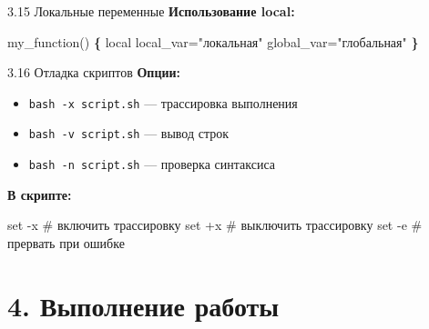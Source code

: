 \documentclass[
  ignorenonframetext,
  aspectratio=169,
  russian,
]{beamer}
\newenvironment{Shaded}{\begin{snugshade}}{\end{snugshade}}
\newcommand{\AttributeTok}[1]{\textcolor[rgb]{0.40,0.45,0.13}{#1}}
\newcommand{\BuiltInTok}[1]{\textcolor[rgb]{0.00,0.23,0.31}{#1}}
\newcommand{\CommentTok}[1]{\textcolor[rgb]{0.37,0.37,0.37}{#1}}
\newcommand{\FunctionTok}[1]{\textcolor[rgb]{0.28,0.35,0.67}{#1}}
\newcommand{\KeywordTok}[1]{\textcolor[rgb]{0.00,0.23,0.31}{\textbf{#1}}}
\newcommand{\NormalTok}[1]{\textcolor[rgb]{0.00,0.23,0.31}{#1}}
\newcommand{\OperatorTok}[1]{\textcolor[rgb]{0.37,0.37,0.37}{#1}}
\newcommand{\StringTok}[1]{\textcolor[rgb]{0.13,0.47,0.30}{#1}}
\newcommand{\VariableTok}[1]{\textcolor[rgb]{0.07,0.07,0.07}{#1}}
\providecommand{\tightlist}{%
  \setlength{\itemsep}{0pt}\setlength{\parskip}{0pt}}
\begin{document}
\begin{frame}[fragile]{3.15 Локальные переменные}
\label{ux43bux43eux43aux430ux43bux44cux43dux44bux435-ux43fux435ux440ux435ux43cux435ux43dux43dux44bux435}
\textbf{Использование local:}

\begin{Shaded}
\begin{Highlighting}[]
\FunctionTok{my\_function()} \KeywordTok{\{}
    \BuiltInTok{local} \VariableTok{local\_var}\OperatorTok{=}\StringTok{"локальная"}
    \VariableTok{global\_var}\OperatorTok{=}\StringTok{"глобальная"}
\KeywordTok{\}}
\end{Highlighting}
\end{Shaded}
\end{frame}

\begin{frame}[fragile]{3.16 Отладка скриптов}
\label{ux43eux442ux43bux430ux434ux43aux430-ux441ux43aux440ux438ux43fux442ux43eux432}
\textbf{Опции:}

\begin{itemize}[<+->]
\tightlist
\item
  \texttt{bash\ -x\ script.sh} --- трассировка выполнения
\item
  \texttt{bash\ -v\ script.sh} --- вывод строк
\item
  \texttt{bash\ -n\ script.sh} --- проверка синтаксиса
\end{itemize}

\textbf{В скрипте:}

\begin{Shaded}
\begin{Highlighting}[]
\BuiltInTok{set} \AttributeTok{{-}x}    \CommentTok{\# включить трассировку}
\BuiltInTok{set}\NormalTok{ +x    }\CommentTok{\# выключить трассировку}
\BuiltInTok{set} \AttributeTok{{-}e}    \CommentTok{\# прервать при ошибке}
\end{Highlighting}
\end{Shaded}
\end{frame}

\section{4. Выполнение
работы}\label{ux432ux44bux43fux43eux43bux43dux435ux43dux438ux435-ux440ux430ux431ux43eux442ux44b}
\end{document}
